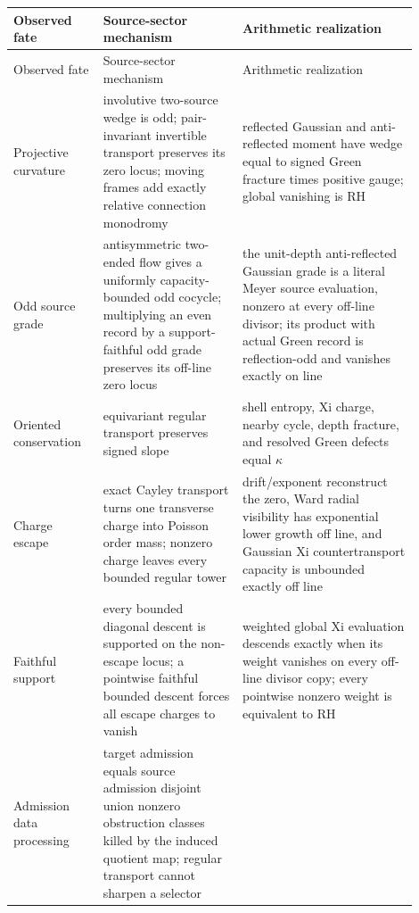 \documentclass[11pt]{article}
\theoremstyle{definition}
\theoremstyle{remark}
\begin{document}
\begingroup
\scriptsize
\setlength{\LTleft}{0pt}
\setlength{\LTright}{0pt}
\begin{longtable}{@{}>{\raggedright\arraybackslash}p{0.20\linewidth}
                >{\raggedright\arraybackslash}p{0.31\linewidth}
                >{\raggedright\arraybackslash}p{0.39\linewidth}@{}}
\toprule
Observed fate & Source-sector mechanism & Arithmetic realization\\
\midrule
\endfirsthead
\toprule
Observed fate & Source-sector mechanism & Arithmetic realization\\
\midrule
\endhead
Projective curvature
 & involutive two-source wedge is odd; pair-invariant invertible transport preserves its zero locus; moving frames add exactly relative connection monodromy
 & reflected Gaussian and anti-reflected moment have wedge equal to signed Green fracture times positive gauge; global vanishing is RH\\\addlinespace[2pt]
Odd source grade
 & antisymmetric two-ended flow gives a uniformly capacity-bounded odd cocycle; multiplying an even record by a support-faithful odd grade preserves its off-line zero locus
 & the unit-depth anti-reflected Gaussian grade is a literal Meyer source evaluation, nonzero at every off-line divisor; its product with actual Green record is reflection-odd and vanishes exactly on line\\\addlinespace[2pt]
Oriented conservation
 & equivariant regular transport preserves signed slope
 & shell entropy, Xi charge, nearby cycle, depth fracture, and resolved Green defects equal \(\kappa\)\\\addlinespace[2pt]
Charge escape
 & exact Cayley transport turns one transverse charge into Poisson order mass; nonzero charge leaves every bounded regular tower
 & drift/exponent reconstruct the zero, Ward radial visibility has exponential lower growth off line, and Gaussian Xi countertransport capacity is unbounded exactly off line\\\addlinespace[2pt]
Faithful support
 & every bounded diagonal descent is supported on the non-escape locus; a pointwise faithful bounded descent forces all escape charges to vanish
 & weighted global Xi evaluation descends exactly when its weight vanishes on every off-line divisor copy; every pointwise nonzero weight is equivalent to RH\\\addlinespace[2pt]
Admission data processing
 & target admission equals source admission disjoint union nonzero obstruction classes killed by the induced quotient map; regular transport cannot sharpen a selector

\end{longtable}
\end{document}
